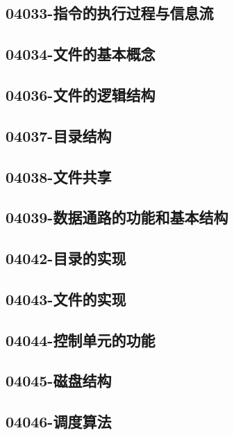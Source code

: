 \subsection{04033-指令的执行过程与信息流}

\subsection{04034-文件的基本概念}

\subsection{04036-文件的逻辑结构}

\subsection{04037-目录结构}

\subsection{04038-文件共享}

\subsection{04039-数据通路的功能和基本结构}

\subsection{04042-目录的实现}

\subsection{04043-文件的实现}

\subsection{04044-控制单元的功能}

\subsection{04045-磁盘结构}

\subsection{04046-调度算法}

